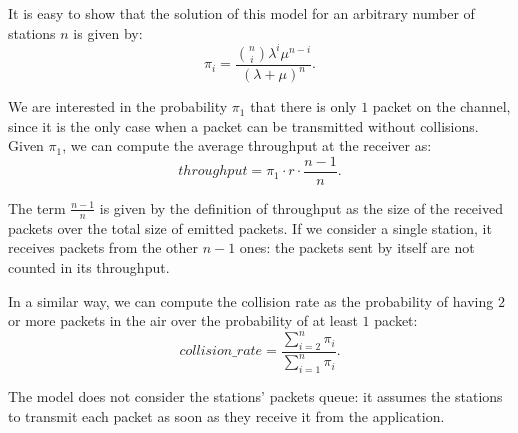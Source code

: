 It is easy to show that the solution of this model for an arbitrary number of stations $n$ is given by:
\begin{equation*}
    \pi_i = \frac{\binom{n}{i} \lambda^i \mu^{n-i}}{(\lambda + \mu)^n}.
\end{equation*}

We are interested in the probability $\pi_1$ that there is only $1$ packet on the channel, since it is the only case when a packet can be transmitted without collisions.
Given $\pi_1$, we can compute the average throughput at the receiver as:
\begin{equation*}
    throughput = \pi_1 \cdot r \cdot \frac{n-1}{n}.
\end{equation*}

The term $\frac{n-1}{n}$ is given by the definition of throughput as the size of the received packets over the total size of emitted packets.
If we consider a single station, it receives packets from the other $n-1$ ones: the packets sent by itself are not counted in its throughput.

In a similar way, we can compute the collision rate as the probability of having $2$ or more packets in the air over the probability of at least $1$ packet:
\begin{equation*}
    collision\_rate = \frac{\sum_{i = 2}^{n} \pi_i}{\sum_{i = 1}^{n} \pi_i}.
\end{equation*}

The model does not consider the stations' packets queue: it assumes the stations to transmit each packet as soon as they receive it from the application.
